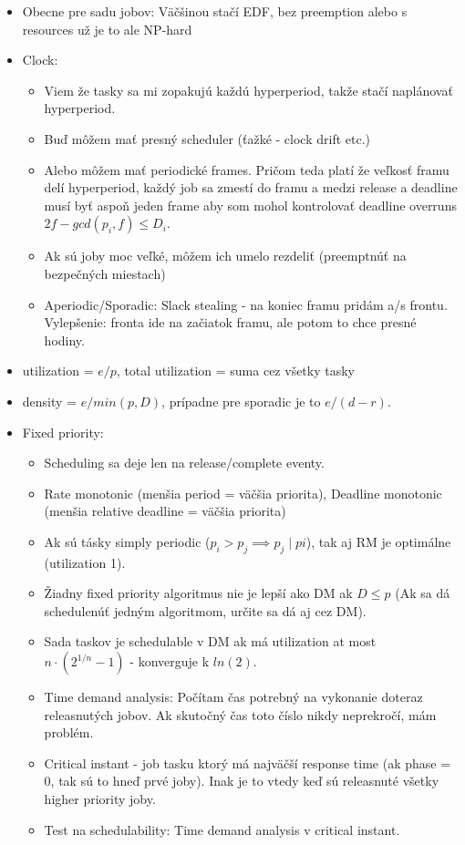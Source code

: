 \documentclass[paper=a4, fontsize=11pt]{scrartcl} %
\numberwithin{equation}{section} %
\numberwithin{figure}{section} %
\numberwithin{table}{section} %
\begin{document}
	\begin{itemize}
		\item Obecne pre sadu jobov: Väčšinou stačí EDF, bez preemption alebo s resources už je to ale NP-hard
		\item Clock:
		
		\begin{itemize}
			\item Viem že tasky sa mi zopakujú každú hyperperiod, takže stačí naplánovať hyperperiod.
			\item Buď môžem mať presný scheduler (ťažké - clock drift etc.)
			\item Alebo môžem mať periodické frames. Pričom teda platí že veľkosť framu delí hyperperiod, každý job sa zmestí do framu a medzi release a deadline musí byť aspoň jeden frame aby som mohol kontrolovať deadline overruns $2f - gcd(p_i, f) \leq D_i$. 
			\item Ak sú joby moc veľké, môžem ich umelo rezdeliť (preemptnúť na bezpečných miestach)
			\item Aperiodic/Sporadic: Slack stealing - na koniec framu pridám a/s frontu. Vylepšenie: fronta ide na začiatok framu, ale potom to chce presné hodiny.
		\end{itemize}
	
		\item utilization = $e/p$, total utilization = suma cez všetky tasky
		\item density = $e/min(p,D)$, prípadne pre sporadic je to $e/(d - r)$.
	
		\item Fixed priority: 
		
		\begin{itemize}
			\item Scheduling sa deje len na release/complete eventy.
			\item Rate monotonic (menšia period = väčšia priorita), Deadline monotonic (menšia relative deadline = väčšia priorita)
			\item Ak sú tásky simply periodic ($p_i > p_j \implies p_j \mid pi$), tak aj RM je optimálne (utilization 1).
			\item Žiadny fixed priority algoritmus nie je lepší ako DM ak $D \leq p$ (Ak sa dá schedulenúť jedným algoritmom, určite sa dá aj cez DM).
			\item Sada taskov je schedulable v DM ak má utilization at most $n \cdot (2^{1/n} - 1)$ - konverguje k $ln(2)$.
			\item Time demand analysis: Počítam čas potrebný na vykonanie doteraz releasnutých jobov. Ak skutočný čas toto číslo nikdy neprekročí, mám problém.
			\item Critical instant - job tasku ktorý má najväčší response time (ak phase = 0, tak sú to hneď prvé joby). Inak je to vtedy keď sú releasnuté všetky higher priority joby.
			\item Test na schedulability: Time demand analysis v critical instant.
		\end{itemize}
	

\end{itemize}
\end{document}
